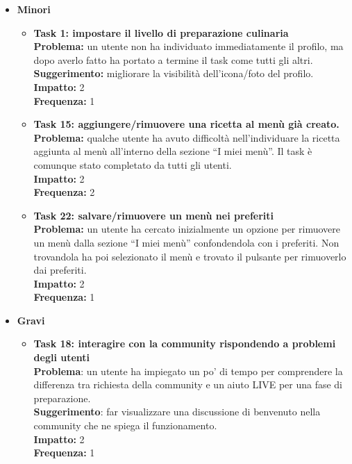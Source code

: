 \begin{itemize}
	\item \textbf{Minori}
		\begin{itemize}
			\item \textbf{Task 1: impostare il livello di preparazione culinaria}\\
				\textbf{Problema:} un utente non ha individuato immediatamente il
				profilo, ma dopo averlo fatto ha portato a termine il task come tutti
				gli altri.\\
				\textbf{Suggerimento:} migliorare la visibilità dell'icona/foto del profilo.\\
				\textbf{Impatto:} 2\\
				\textbf{Frequenza:} 1\\


			\item \textbf{Task 15: aggiungere/rimuovere una ricetta al menù già creato.}\\
				\textbf{Problema:} qualche utente ha avuto difficoltà nell'individuare la
				ricetta aggiunta al menù all'interno della sezione ``I miei menù''. Il
				task è comunque stato completato da tutti gli utenti.\\
				\textbf{Impatto:} 2\\
				\textbf{Frequenza:} 2\\
			
			\item \textbf{Task 22: salvare/rimuovere un menù nei preferiti}\\
				\textbf{Problema:} un utente ha cercato inizialmente un opzione per
				rimuovere un menù dalla sezione ``I miei menù'' confondendola con i
				preferiti. Non trovandola ha
				poi selezionato il menù e trovato il pulsante per rimuoverlo dai
				preferiti.\\
				\textbf{Impatto:} 2\\
				\textbf{Frequenza:} 1\\
		\end{itemize}

	\item \textbf{Gravi}
		\begin{itemize}
		
			\item \textbf{Task 18: interagire con la community rispondendo a problemi degli utenti}\\
				\textbf{Problema}: un utente ha impiegato un po' di tempo per comprendere la
				differenza tra richiesta della community e un aiuto LIVE per una fase di
				preparazione.\\
				\textbf{Suggerimento}: far visualizzare una discussione
				di benvenuto nella community che ne spiega il funzionamento.\\
				\textbf{Impatto:} 2\\
				\textbf{Frequenza:} 1\\
			

\end{itemize}
\end{itemize}
